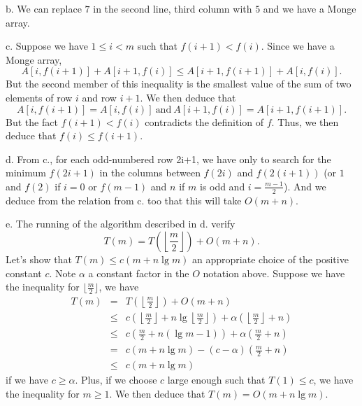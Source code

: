 \documentclass[a4paper,12pt]{article}
\newcommand{\subpar}[1]{\medskip \noindent #1.}
\begin{document}
\subpar{b} We can replace $7$ in the second line, third column with $5$ and we
have a Monge array.

\subpar{c} Suppose we have $1 \le i < m$ such that $f(i+1) < f(i)$.
Since we have a Monge array,
\[ A[i, f(i+1)] + A[i+1, f(i)] \le A[i+1, f(i+1)] + A[i, f(i)].\]
But the second member of this inequality is the smallest value of the
sum of two elements of row $i$ and row $i+1$.  We then deduce that
\[ A[i, f(i+1)] = A[i, f(i)]\ \mbox{and}\ A[i+1, f(i)] = A[i+1,
  f(i+1)].\]
But the fact $f(i+1) < f(i)$ contradicts the definition of $f$.  Thus,
we then deduce that $f(i) \le f(i+1)$.

\subpar{d}  From c., for each odd-numbered row 2i+1, we have only to
search for the minimum $f(2i+1)$ in the columns between $f(2i)$ and $f(2(i+1))$
(or $1$ and $f(2)$ if $i=0$ or $f(m-1)$ and $n$ if $m$ is odd and
$i=\frac{m-1}{2}$).  And we deduce from the relation from c. too that
this will take $O(m+n)$.

\subpar{e}  The running of the algorithm described in d. verify
\[ T(m) = T\left(\left\lfloor \frac{m}{2}\right\rfloor\right) +
O(m+n).\] Let's show that $T(m) \le c(m + n\lg m)$ an appropriate
choice of the positive constant $c$.  Note $\alpha$ a constant factor
in the $O$ notation above.  Suppose we have the inequality for
$\lfloor\frac{m}{2}\rfloor$, we have
\begin{eqnarray*}
  T(m) &=& T\left(\left\lfloor \frac{m}{2}\right\rfloor\right)
  + O(m+n) \\ &\le&
  c\left(\left\lfloor\frac{m}{2}\right\rfloor +
  n \lg \left\lfloor\frac{m}{2}\right\rfloor\right) +
  \alpha \left(\left\lfloor\frac{m}{2}\right\rfloor + n\right) \\
  &\le& c\left(\frac{m}{2} + n (\lg m -1)\right) +
  \alpha\left(\frac{m}{2} + n\right) \\ &=&
  c(m + n\lg m) - (c-\alpha)\left(\frac{m}{2} + n\right) \\
  &\le& c(m + n\lg m)
\end{eqnarray*}
if we have $c \ge \alpha$.  Plus, if we choose $c$ large enough such
that $T(1) \le c$, we have the inequality for $m \ge 1$.  We then
deduce that $T(m) = O(m + n\lg m)$.
\end{document}
